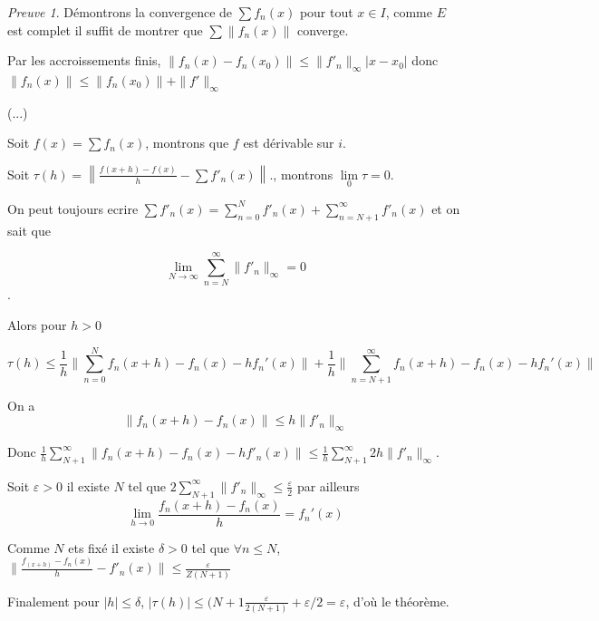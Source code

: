 \documentclass[]{article}
\theoremstyle{remark}
\newtheorem{myproof}{Preuve}
\theoremstyle{definition}
\begin{document}
\begin{myproof}
	Démontrons la convergence de $\sum f_n(x)$ pour tout $x \in I$, comme $E$ est complet il suffit de montrer que $\sum \|f_n(x)\|$ converge.
	
	Par les accroissements finis, $\|f_n(x) - f_n(x_0)\| \leqslant \|f'_n\|_{\infty} |x - x_0|$ donc $\|f_n(x)\| \leqslant \|f_n(x_0)\| + \|f'\|_{\infty}$
	
	(...)
	
	Soit $f(x) = \sum f_n(x)$, montrons que $f$ est dérivable sur $i$.
	
	Soit $\tau(h) = \left\|\frac{f(x+h) - f(x)}{h} - \sum f'_n(x)\right\|$., montrons $\lim\limits_{0} \tau = 0$.
	
	On peut toujours ecrire $\sum f'_n(x) = \sum_{ n = 0}^{N} f'_n(x) + \sum_{n = N+1}^{\infty} f'_n(x)$ et on sait que
	
	$$\lim\limits_{N \to \infty} \sum_{n=N}^{\infty}\|f'_n\|_{\infty} = 0$$.
	
	Alors pour $h > 0$
	
	$$\tau(h) \leqslant \frac{1}{h} \|\sum_{n = 0}^{N} f_n(x+h) - f_n(x) - h f_n'(x)\| + \frac{1}{h} \|\sum_{n=N+1}^{\infty} f_n(x+h) - f_n(x) - hf_n'(x)\|$$
	
	On a $$\|f_n(x+h) - f_n(x)\| \leqslant h \|f'_n\|_{\infty}$$
	
	Donc $\frac{1}{h} \sum_{N+1}^{\infty} \|f_n(x+h) - f_n(x) - h f'_n(x)\| \leqslant\frac{1}{h} \sum_{N+1}^{\infty} 2h \|f'_n\|_{\infty}$.
	
	Soit $\varepsilon > 0$ il existe $N$ tel que $2 \sum_{N+1}^{\infty} \|f'_n\|_{\infty} \leqslant \frac{\varepsilon}{2}$ par ailleurs $$\lim\limits_{h \to 0} \frac{f_n(x+h) - f_n(x)}{h} = f_n'(x)$$
	
	Comme $N$ ets fixé il existe $\delta > 0$ tel que $\forall n \leqslant N$, $\|\frac{f_(x+h) - f_n(x)}{h} - f'_n(x)\| \leqslant \frac{\varepsilon}{Z(N+1)}$
	
	Finalement pour $|h| \leqslant \delta$, $|\tau(h)| \leqslant (N+1 \frac{\varepsilon}{2(N+1)} + \varepsilon/2 = \varepsilon$, d'où le théorème.
\end{myproof}
\end{document}
